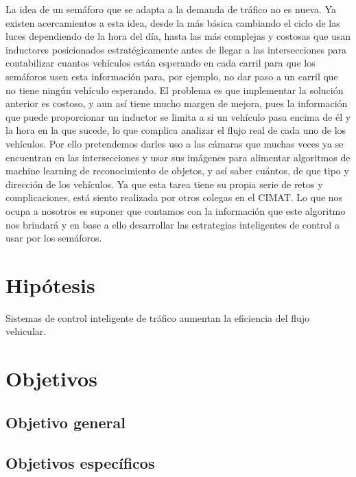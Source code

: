 La idea de un semáforo que se adapta a la demanda de tráfico no es
nueva. Ya existen acercamientos a esta idea, desde la más básica
cambiando el ciclo de las luces dependiendo de la hora del día, hasta
las más complejas y costosas que usan inductores posicionados
estratégicamente antes de llegar a las intersecciones para contabilizar
cuantos vehículos están esperando en cada carril para que los semáforos
usen esta información para, por ejemplo, no dar paso a un carril que no
tiene ningún vehículo esperando. El problema es que implementar la
solución anterior es costoso, y aun así tiene mucho margen de mejora,
pues la información que puede proporcionar un inductor se limita a si un
vehículo pasa encima de él y la hora en la que sucede, lo que complica
analizar el flujo real de cada uno de los vehículos. Por ello
pretendemos darles uso a las cámaras que muchas veces ya se encuentran
en las intersecciones y usar sus imágenes para alimentar algoritmos de
machine learning de reconocimiento de objetos, y así saber cuántos, de
que tipo y dirección de los vehículos. Ya que esta tarea tiene su propia
serie de retos y complicaciones, está siento realizada por otros colegas
en el CIMAT. Lo que nos ocupa a nosotros es suponer que contamos con la
información que este algoritmo nos brindará y en base a ello desarrollar
las estrategias inteligentes de control a usar por los semáforos.

\hypertarget{hipuxf3tesis}{%
\section{Hipótesis}\label{hipuxf3tesis}}

Sistemas de control inteligente de tráfico aumentan la eficiencia del
flujo vehicular.

\hypertarget{objetivos}{%
\section{Objetivos}\label{objetivos}}

\hypertarget{objetivo-general}{%
\subsection{Objetivo general}\label{objetivo-general}}

\hypertarget{objetivos-especuxedficos}{%
\subsection{Objetivos específicos}\label{objetivos-especuxedficos}}


